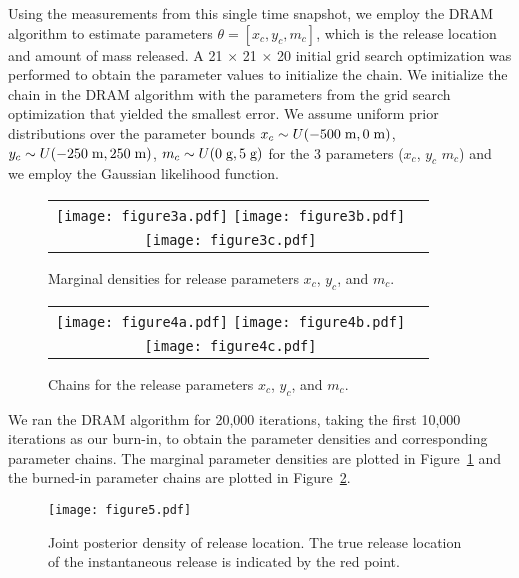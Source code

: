 \documentclass[sn-mathphys-ay]{sn-jnl}
\begin{document}
Using the measurements from this single time snapshot, we employ the DRAM algorithm \citep{HLMS,Smith2013Uncertainty} to estimate parameters $\theta=[x_c, y_c,m_c]$, which is the release location and amount of mass released. A 21 $\times$ 21 $\times$ 20 initial grid search optimization was performed to obtain the parameter values to initialize the chain. We initialize the chain in the DRAM algorithm with the parameters from the grid search optimization that yielded the smallest error. We assume uniform prior distributions over the parameter bounds $x_c \sim U(-500 \hspace{1mm} \text{m},0 \hspace{1mm} \text{m})$,  $y_c \sim U(-250 \hspace{1mm} \text{m},250 \hspace{1mm} \text{m})$, $m_c \sim U(0 \hspace{1mm} \text{g},5 \hspace{1mm} \text{g})$ for the 3 parameters ($x_c$, $y_c$ $m_c$) and we employ the Gaussian likelihood function.

\begin{figure}
    \centering
    \begin{tabular}{c c}
    \texttt{[image: figure3a.pdf]}
    \texttt{[image: figure3b.pdf]}\\
    \texttt{[image: figure3c.pdf]}
    \end{tabular}
         \caption{Marginal densities for release parameters $x_c$, $y_c$, and $m_c$.}
    \label{fig:densities}
\end{figure}
\begin{figure}
    \centering
    \begin{tabular}{c c}
    \texttt{[image: figure4a.pdf]}
    \texttt{[image: figure4b.pdf]}\\
    \texttt{[image: figure4c.pdf]}
    \end{tabular}
         \caption{Chains for the release parameters $x_c$, $y_c$, and $m_c$.}
    \label{fig:chains}
  \end{figure}

We ran the DRAM algorithm for 20,000 iterations, taking the first 10,000 iterations as our burn-in, to obtain the parameter densities and corresponding parameter chains. The marginal parameter densities are plotted in Figure~\ref{fig:densities} and the burned-in parameter chains are plotted in Figure~\ref{fig:chains}. 

 \begin{figure}
    \centering
    \texttt{[image: figure5.pdf]}
     \caption{Joint posterior density of release location. The true release location of the instantaneous release is indicated by the red point.}
         \label{fig:posterior}
 \end{figure}
\end{document}
